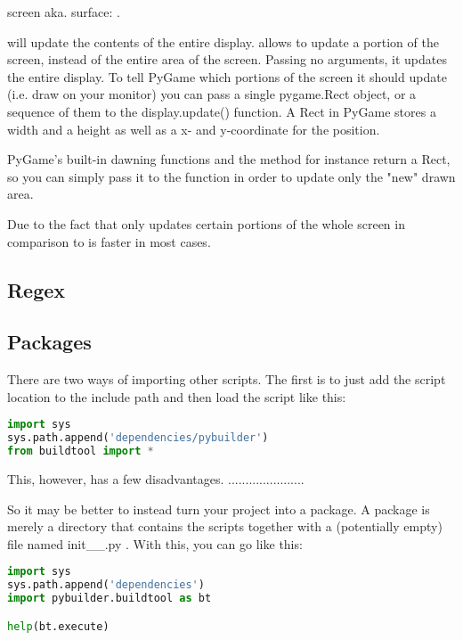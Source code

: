 screen aka. surface: .

 will update the contents of the entire display.  allows to update a portion of the screen, instead of the entire area of the screen. Passing no arguments, it updates the entire display. 
To tell PyGame which portions of the screen it should update (i.e. draw on your monitor) you can pass a single pygame.Rect object, or a sequence of them to the display.update() function. A Rect in PyGame stores a width and a height as well as a x- and y-coordinate for the position.

PyGame's built-in dawning functions and the  method for instance return a Rect, so you can simply pass it to the  function in order to update only the "new" drawn area.

Due to the fact that  only updates certain portions of the whole screen in comparison to  is faster in most cases.


\subsection{Regex}



\subsection{Packages}
There are two ways of importing other scripts. The first is to just add the script location to the include path and then load the script like this: 

\begin{lstlisting}[language=python]
import sys
sys.path.append('dependencies/pybuilder')
from buildtool import *
\end{lstlisting}

This, however, has a few disadvantages. ......................

So it may be better to instead turn your project into a package. A package is merely a directory that contains the scripts together with a (potentially empty) file named \verb __init__.py . With this, you can go like this:
\begin{lstlisting}[language=python]
import sys
sys.path.append('dependencies')
import pybuilder.buildtool as bt

help(bt.execute)
\end{lstlisting}

